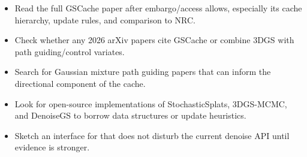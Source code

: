 \documentclass[11pt]{article}
\begin{document}
\begin{itemize}
  \item Read the full GSCache paper after embargo/access allows, especially its
        cache hierarchy, update rules, and comparison to NRC.
  \item Check whether any 2026 arXiv papers cite GSCache or combine 3DGS with
        path guiding/control variates.
  \item Search for Gaussian mixture path guiding papers that can inform the
        directional component of the cache.
  \item Look for open-source implementations of StochasticSplats, 3DGS-MCMC,
        and DenoiseGS to borrow data structures or update heuristics.
  \item Sketch an interface for  that does not
        disturb the current denoise API until evidence is stronger.
\end{itemize}
\end{document}
